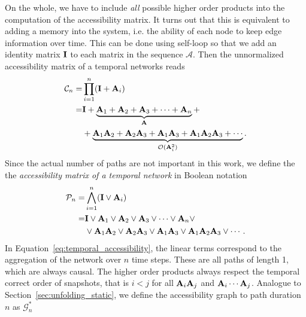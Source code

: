 On the whole, we have to include \emph{all} possible higher order products into the computation of the accessibility matrix.
It turns out that this is equivalent to adding a memory into the system, i.e. the ability of each node to keep edge information over time.
This can be done using self-loop so that we add an identity matrix $\mathbf{I}$ to each matrix in the sequence $\mathcal{A}$.
Then the unnormalized accessibility matrix of a temporal networks reads
%
\begin{align*}
\mathcal{C}_n=&\prod _{i=1} ^n (\mathbf{I} + \mathbf{A}_i ) \\
=& \mathbf{I}+\underbrace{ \mathbf{A}_1+\mathbf{A}_2+\mathbf{A}_3+\cdots + \mathbf{A}_n}_{\mathbf{A}} + \nonumber \\
&+ \underbrace{\mathbf{A}_1\mathbf{A}_2+\mathbf{A}_2\mathbf{A}_3+ \mathbf{A}_1\mathbf{A}_3+ \mathbf{A}_1\mathbf{A}_2\mathbf{A}_3 +\cdots }_{\mathcal{O}(\mathbf{A}_i ^2)}\nonumber .
\end{align*}
Since the actual number of paths are not important in this work, we define the the \emph{accessibility matrix of a temporal network} in Boolean notation
%
\begin{align}
\mathcal{P}_n=&\bigwedge _{i=1} ^n (\mathbf{I} \vee \mathbf{A}_i ) \label{eq:temporal_accessibility} \\
= & \mathbf{I}\vee \mathbf{A}_1\vee \mathbf{A}_2\vee \mathbf{A}_3\vee \cdots \vee \mathbf{A}_n \vee \nonumber \\
& \vee \mathbf{A}_1\mathbf{A}_2\vee \mathbf{A}_2\mathbf{A}_3\vee  \mathbf{A}_1\mathbf{A}_3\vee  \mathbf{A}_1\mathbf{A}_2\mathbf{A}_3 \vee \cdots . \nonumber
\end{align}
%
In Equation~\eqref{eq:temporal_accessibility}, the linear terms correspond to the aggregation of the network over $n$ time steps.
These are all paths of length 1, which are always causal.
The higher order products always respect the temporal correct order of snapshots, that is $i<j$ for all $\mathbf{A}_i\mathbf{A}_j$ and $\mathbf{A}_i \cdots \mathbf{A}_j $.
Analogue to Section~\ref{sec:unfolding_static}, we define the accessibility graph to path duration $n$ as $\mathcal{G}_n ^*$

